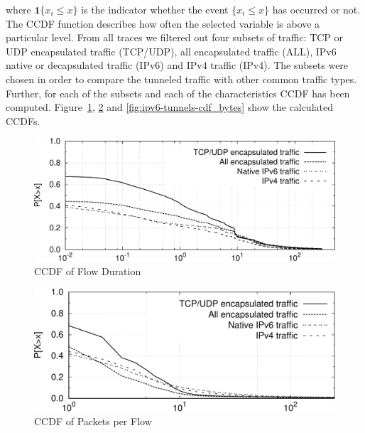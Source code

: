 where $\mathbf{1}\{x_{i}\leq x\}$ is the indicator whether the event $\{x_{i}\leq x\}$ has occurred or not. The CCDF function describes how often the selected variable is above a particular level. From all traces we filtered out four subsets of traffic: TCP or UDP encapsulated traffic (TCP/UDP), all encapsulated traffic (ALL), IPv6 native or decapsulated traffic (IPv6) and IPv4 traffic (IPv4). The subsets were chosen in order to compare the tunneled traffic with other common traffic types. Further, for each of the subsets and each of the characteristics CCDF has been computed. Figure~\ref{fig:ipv6-tunnels-cdf_duration}, \ref{fig:ipv6-tunnels-cdf_packets} and \ref{fig:ipv6-tunnels-cdf_bytes} show the calculated CCDFs.

\begin{figure}[!tb]
     \centering
     \includegraphics[width=1.00\textwidth]{figures/paper-tunnels/cdf_functions/cdf_duration}
     \caption{CCDF of Flow Duration}
     \label{fig:ipv6-tunnels-cdf_duration}
\end{figure}

\begin{figure}[!tb]
     \centering
     \includegraphics[width=1.00\textwidth]{figures/paper-tunnels/cdf_functions/cdf_packets}
     \caption{CCDF of Packets per Flow}
     \label{fig:ipv6-tunnels-cdf_packets}
\end{figure}

